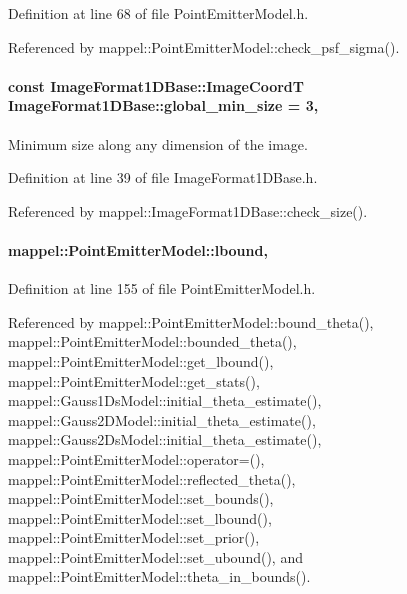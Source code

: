 Definition at line 68 of file Point\+Emitter\+Model.\+h.



Referenced by mappel\+::\+Point\+Emitter\+Model\+::check\+\_\+psf\+\_\+sigma().

\paragraph[{\texorpdfstring{global\+\_\+min\+\_\+size}{global_min_size}}]{\setlength{\rightskip}{0pt plus 5cm}const {\bf Image\+Format1\+D\+Base\+::\+Image\+CoordT} Image\+Format1\+D\+Base\+::global\+\_\+min\+\_\+size = 3\hspace{0.3cm}{\ttfamily [static]}, {\ttfamily [inherited]}}\hypertarget{classmappel_1_1ImageFormat1DBase_a27c75df8b3d83856d7c2c42ee987af89}{}\label{classmappel_1_1ImageFormat1DBase_a27c75df8b3d83856d7c2c42ee987af89}
Minimum size along any dimension of the image. 

Definition at line 39 of file Image\+Format1\+D\+Base.\+h.



Referenced by mappel\+::\+Image\+Format1\+D\+Base\+::check\+\_\+size().

\paragraph[{\texorpdfstring{lbound}{lbound}}]{ mappel\+::\+Point\+Emitter\+Model\+::lbound\hspace{0.3cm}{\ttfamily [protected]}, {\ttfamily [inherited]}}\hypertarget{classmappel_1_1PointEmitterModel_a889bc82f74cfa654da121e5770296ab2}{}\label{classmappel_1_1PointEmitterModel_a889bc82f74cfa654da121e5770296ab2}


Definition at line 155 of file Point\+Emitter\+Model.\+h.



Referenced by mappel\+::\+Point\+Emitter\+Model\+::bound\+\_\+theta(), mappel\+::\+Point\+Emitter\+Model\+::bounded\+\_\+theta(), mappel\+::\+Point\+Emitter\+Model\+::get\+\_\+lbound(), mappel\+::\+Point\+Emitter\+Model\+::get\+\_\+stats(), mappel\+::\+Gauss1\+Ds\+Model\+::initial\+\_\+theta\+\_\+estimate(), mappel\+::\+Gauss2\+D\+Model\+::initial\+\_\+theta\+\_\+estimate(), mappel\+::\+Gauss2\+Ds\+Model\+::initial\+\_\+theta\+\_\+estimate(), mappel\+::\+Point\+Emitter\+Model\+::operator=(), mappel\+::\+Point\+Emitter\+Model\+::reflected\+\_\+theta(), mappel\+::\+Point\+Emitter\+Model\+::set\+\_\+bounds(), mappel\+::\+Point\+Emitter\+Model\+::set\+\_\+lbound(), mappel\+::\+Point\+Emitter\+Model\+::set\+\_\+prior(), mappel\+::\+Point\+Emitter\+Model\+::set\+\_\+ubound(), and mappel\+::\+Point\+Emitter\+Model\+::theta\+\_\+in\+\_\+bounds().

